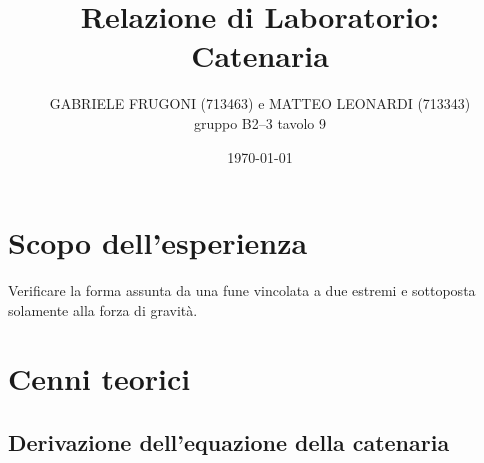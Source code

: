 \documentclass[a4paper,12pt]{article}
\title{Relazione di Laboratorio: Catenaria}       %
\author{GABRIELE FRUGONI (713463) e MATTEO LEONARDI (713343)\\ gruppo B2--3 tavolo 9}
\date{\today}
\begin{document}
\maketitle

\section{Scopo dell'esperienza}

Verificare la forma assunta da una fune vincolata a due estremi e sottoposta solamente alla forza di gravità.

\section{Cenni teorici}

\subsection{Derivazione dell'equazione della catenaria}
\end{document}
